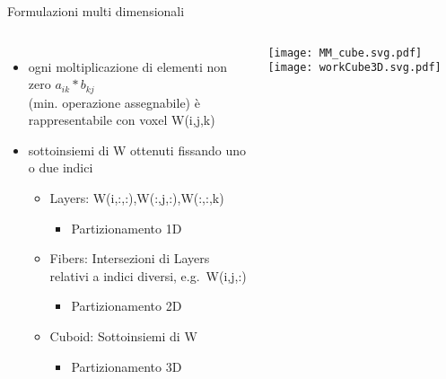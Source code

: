 \begin{frame} {Formulazioni multi dimensionali}
\begin{columns}
	\begin{itemize}
		\item	ogni moltiplicazione di elementi non zero $a_{ik} \ast b_{kj}$\\
				(min. operazione assegnabile) è rappresentabile con voxel W(i,j,k)
		\item	sottoinsiemi di W ottenuti fissando uno o due indici
		\begin{itemize}
			\item	Layers: W(i,:,:),W(:,j,:),W(:,:,k)
			\begin{itemize}
				\item	Partizionamento 1D
			\end{itemize}
		\end{itemize}
		\begin{itemize}
			\item	Fibers: Intersezioni di Layers relativi a indici diversi, e.g. W(i,j,:)
			\begin{itemize}
				\item	Partizionamento 2D
			\end{itemize}
		\end{itemize}
		\begin{itemize}
			\item	Cuboid: Sottoinsiemi di W 	
			\begin{itemize}
				\item	Partizionamento 3D
			\end{itemize}
		\end{itemize}
	\end{itemize}
	\texttt{[image: MM\_cube.svg.pdf]}
	\voidLine
	\voidLine
	\voidLine
	\texttt{[image: workCube3D.svg.pdf]}
		
\end{columns}

\end{frame}

